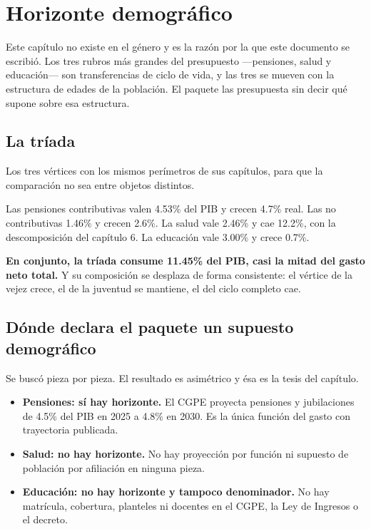 \chapter{Horizonte demográfico}

Este capítulo no existe en el género y es la razón por la que este documento se
escribió. Los tres rubros más grandes del presupuesto —pensiones, salud y
educación— son transferencias de ciclo de vida, y las tres se mueven con la
estructura de edades de la población. El paquete las presupuesta sin decir qué
supone sobre esa estructura.

\section{La tríada}



Los tres vértices con los mismos perímetros de sus capítulos, para que la
comparación no sea entre objetos distintos.

Las pensiones contributivas valen 4.53\% del PIB y crecen 4.7\% real. Las no
contributivas 1.46\% y crecen 2.6\%. La salud vale 2.46\% y cae 12.2\%, con la
descomposición del capítulo 6. La educación vale 3.00\% y crece 0.7\%.

\textbf{En conjunto, la tríada consume 11.45\% del PIB, casi la mitad del gasto
neto total.} Y su composición se desplaza de forma consistente: el vértice de la
vejez crece, el de la juventud se mantiene, el del ciclo completo cae.



\section{Dónde declara el paquete un supuesto demográfico}

Se buscó pieza por pieza. El resultado es asimétrico y ésa es la tesis del
capítulo.

\begin{itemize}
\item \textbf{Pensiones: sí hay horizonte.} El CGPE proyecta pensiones y
jubilaciones de 4.5\% del PIB en 2025 a 4.8\% en 2030. Es la única función del
gasto con trayectoria publicada.
\item \textbf{Salud: no hay horizonte.} No hay proyección por función ni supuesto
de población por afiliación en ninguna pieza.
\item \textbf{Educación: no hay horizonte y tampoco denominador.} No hay
matrícula, cobertura, planteles ni docentes en el CGPE, la Ley de Ingresos o el
decreto.
\end{itemize}

